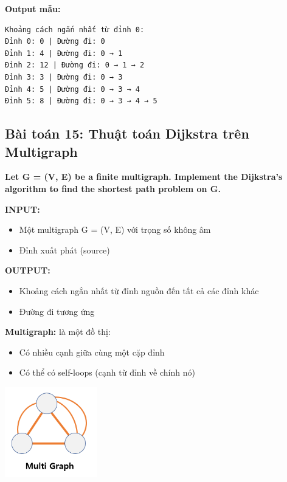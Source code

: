 \documentclass[12pt,a4paper]{article}
\begin{document}
\textbf{Output mẫu:}
\begin{verbatim}
Khoảng cách ngắn nhất từ đỉnh 0:
Đỉnh 0: 0 | Đường đi: 0
Đỉnh 1: 4 | Đường đi: 0 → 1
Đỉnh 2: 12 | Đường đi: 0 → 1 → 2
Đỉnh 3: 3 | Đường đi: 0 → 3
Đỉnh 4: 5 | Đường đi: 0 → 3 → 4
Đỉnh 5: 8 | Đường đi: 0 → 3 → 4 → 5
\end{verbatim}
\newpage
\subsection{Bài toán 15: Thuật toán Dijkstra trên Multigraph}

\begin{problembox}
    \textbf{Let G = (V, E) be a finite multigraph. Implement the Dijkstra's algorithm to find the shortest path problem on G.}
\end{problembox}


\textbf{INPUT:}
\begin{itemize}[label=\textbullet]
    \item Một multigraph G = (V, E) với trọng số không âm
    \item Đỉnh xuất phát (source)
\end{itemize}

\textbf{OUTPUT:}
\begin{itemize}[label=\textbullet]
    \item Khoảng cách ngắn nhất từ đỉnh nguồn đến tất cả các đỉnh khác
    \item Đường đi tương ứng
\end{itemize}

\textbf{Multigraph:} là một đồ thị:
\begin{itemize}[label=\textbullet]
    \item Có nhiều cạnh giữa cùng một cặp đỉnh
    \item Có thể có self-loops (cạnh từ đỉnh về chính nó)
\end{itemize}
{\centering
    \includegraphics[width=0.3\textwidth]{assets/image/multigraph.png}
\par}
\vspace{1cm}
\end{document}
